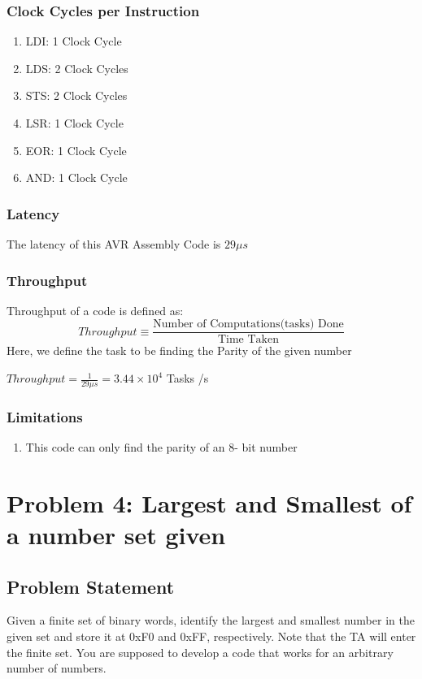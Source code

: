 \documentclass[titlepage, 11pt]{article}
\begin{document}
\subsubsection{Clock Cycles per Instruction}
\begin{enumerate}
\item LDI: 1 Clock Cycle
\item LDS: 2 Clock Cycles
\item STS: 2 Clock Cycles
\item LSR: 1 Clock Cycle
\item EOR: 1 Clock Cycle
\item AND: 1 Clock Cycle
\end{enumerate}

\subsubsection{Latency}
The latency of this AVR Assembly Code is $ 29 \mu s$

\subsubsection{Throughput}
Throughput of a code is defined as:
$$ Throughput \equiv \frac{\text{Number of Computations(tasks) Done}}{\text{Time Taken}}$$
Here, we define the task to be finding the Parity of the given number

$Throughput= \frac{1}{29 \mu s} =3.44 \times 10^{4}$ Tasks /s

\subsubsection{Limitations}
\begin{enumerate}
\item This code can only find the parity of an 8- bit number
\end{enumerate}

\section{Problem 4: Largest and Smallest of a number set given}
\subsection{Problem Statement}
Given a finite set of binary words, identify the largest and smallest number in the given set and store it at 0xF0 and 0xFF, respectively. Note that the TA will enter the finite set. You are supposed to develop a code that works for an arbitrary number of numbers.
\end{document}
